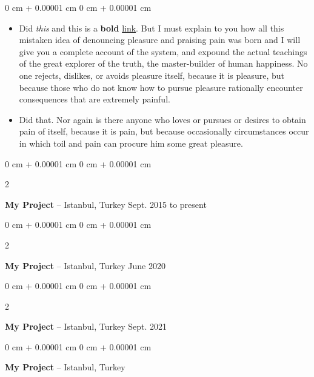 \documentclass[10pt, letterpaper]{article}
\newenvironment{highlights}{
    \begin{itemize}[
        topsep=0.10 cm,
        parsep=0.10 cm,
        partopsep=0pt,
        itemsep=0pt,
        leftmargin=0 cm + 10pt
    ]
}{
    \end{itemize}
} %
\newenvironment{onecolentry}{
    \begin{adjustwidth}{
        0 cm + 0.00001 cm
    }{
        0 cm + 0.00001 cm
    }
}{
    \end{adjustwidth}
} %
\newenvironment{twocolentry}[2][]{
    \onecolentry
    \def\secondColumn{#2}
    \setcolumnwidth{\fill, 4.5 cm}
    \begin{paracol}{2}
}{
    \switchcolumn \raggedleft \secondColumn
    \end{paracol}
    \endonecolentry
} %
\begin{document}
        \vspace{0.10 cm}
        \begin{onecolentry}
            \begin{highlights}
                \item Did \textit{this} and this is a \textbf{bold} \href{https://example.com}{link}. But I must explain to you how all this mistaken idea of denouncing pleasure and praising pain was born and I will give you a complete account of the system, and expound the actual teachings of the great explorer of the truth, the master-builder of human happiness. No one rejects, dislikes, or avoids pleasure itself, because it is pleasure, but because those who do not know how to pursue pleasure rationally encounter consequences that are extremely painful.
                \item Did that. Nor again is there anyone who loves or pursues or desires to obtain pain of itself, because it is pain, but because occasionally circumstances occur in which toil and pain can procure him some great pleasure.
            \end{highlights}
        \end{onecolentry}


        \vspace{0.2 cm}

        \begin{twocolentry}{
            Sept. 2015 to present
        }
            \textbf{My Project} -- Istanbul, Turkey\end{twocolentry}



        \vspace{0.2 cm}

        \begin{twocolentry}{
            June 2020
        }
            \textbf{My Project} -- Istanbul, Turkey\end{twocolentry}



        \vspace{0.2 cm}

        \begin{twocolentry}{
            Sept. 2021
        }
            \textbf{My Project} -- Istanbul, Turkey\end{twocolentry}



        \vspace{0.2 cm}

        \begin{onecolentry}
            \textbf{My Project} -- Istanbul, Turkey\end{onecolentry}
\end{document}
